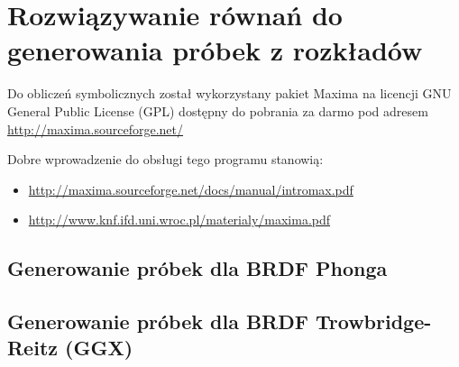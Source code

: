 \documentclass[../main.tex]{subfiles}
\begin{document}
\chapter{Rozwiązywanie równań do generowania próbek z rozkładów}
\label{appendix:maxima}

Do obliczeń symbolicznych został wykorzystany pakiet Maxima na licencji GNU
General Public License (GPL) dostępny do pobrania za darmo pod adresem \url{http://maxima.sourceforge.net/}

Dobre wprowadzenie do obsługi tego programu stanowią:
\begin{itemize}
\item \url{http://maxima.sourceforge.net/docs/manual/intromax.pdf}
\item \url{http://www.knf.ifd.uni.wroc.pl/materialy/maxima.pdf}
\end{itemize}

\section{Generowanie próbek dla BRDF Phonga}


\section{Generowanie próbek dla BRDF Trowbridge-Reitz (GGX)}

\end{document}
